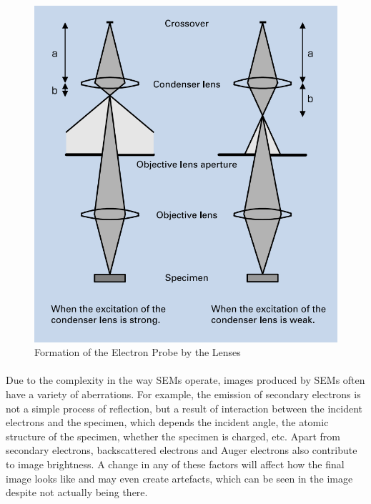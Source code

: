 \documentclass[12pt,a4paper]{article}
\begin{document}
\begin{figure}[h!]
  \centering
  \includegraphics[scale=0.5]{"Lenses"}
  \caption{Formation of the Electron Probe by the Lenses \cite{SEMAToZ}}
  \label{fig:Lenses}
\end{figure}

\paragraph{}
Due to the complexity in the way SEMs operate, images produced by SEMs often have a variety of aberrations. For example, the emission of secondary electrons is not a simple process of reflection, but a result of interaction between the incident electrons and the specimen, which depends the incident angle, the atomic structure of the specimen, whether the specimen is charged, etc. Apart from secondary electrons, backscattered electrons and Auger electrons also contribute to image brightness. A change in any of these factors will affect how the final image looks like and may even create artefacts, which can be seen in the image despite not actually being there.
\end{document}
